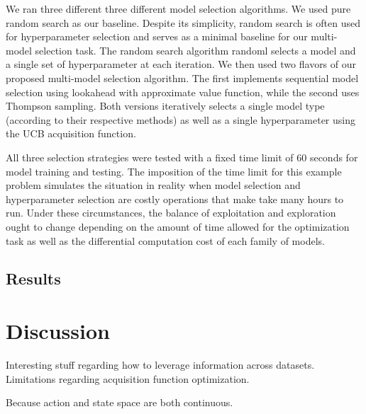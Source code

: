 \documentclass{article}
\begin{document}
We ran three different three different model selection algorithms. We used pure random search as our baseline. Despite its simplicity, random search is often used for hyperparameter selection and serves as a minimal baseline for our multi-model selection task. The random search algorithm randoml selects a model and a single set of hyperparameter at each iteration. We then used two flavors of our proposed multi-model selection algorithm. The first implements sequential model selection using lookahead with approximate value function, while the second uses Thompson sampling. Both versions iteratively selects a single model type (according to their respective methods) as well as a single hyperparameter using the UCB acquisition function.

All three selection strategies were tested with a fixed time limit of $60$ seconds for model training and testing. The imposition of the time limit for this example problem simulates the situation in reality when model selection and hyperparameter selection are costly operations that make take many hours to run. Under these circumstances, the balance of exploitation and exploration ought to change depending on the amount of time allowed for the optimization task as well as the differential computation cost of each family of models.

\subsection{Results}

\section{Discussion}

Interesting stuff regarding how to leverage information across datasets. Limitations regarding acquisition function optimization. \cite{adams:prior} \cite{adams:practical} \cite{rasmussen:book} \cite{rasmussen:lecture} \cite{kernel} \cite{garnett} \cite{sparse} \cite{deepfeature} \cite{mykel}




Because action and state space are both continuous. 


% 


\end{document}
